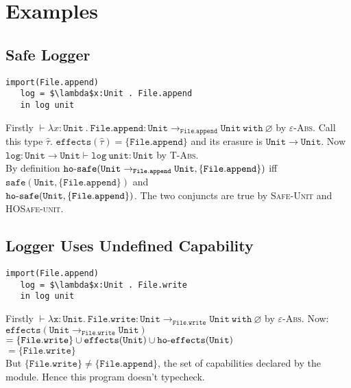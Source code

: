 \documentclass{llncs}
\newcommand{\keywadj}[1]{\mathtt{#1}}
\newcommand{\keyw}[1]{\keywadj{#1}~}
\newcommand{\kw}[1]{\keyw{ #1 }}
\newcommand{\kwa}[1]{\keywadj{ #1 }}
\newcommand{\hyphen}{\hbox{-}}
\newcommand{\unit}[0]{ \kwa{unit} }
\newcommand{\Unit}[0]{ \kwa{Unit} }
\begin{document}
\section{Examples}



\subsection{Safe Logger}
\begin{lstlisting}
import(File.append)
   log = $\lambda$x:Unit . File.append
   in log unit
\end{lstlisting}

\noindent
Firstly $\vdash \lambda x:\kwa{Unit~.~File.append : Unit \rightarrow_{File.append} Unit~\kw{with} \varnothing}$ by \textsc{$\varepsilon$-Abs}. Call this type $\hat \tau$. $\kwa{effects}(\hat \tau) = \{ \kwa{File.append} \}$ and its erasure is $\Unit \rightarrow \Unit$. Now $\kwa{log} : \Unit \rightarrow \Unit \vdash \kwa{log}~\unit : \Unit$ by \textsc{T-Abs}. \\

\noindent
By definition $\kwa{ho \hyphen safe(Unit \rightarrow_{File.append} Unit, \{ \kwa{File.append} \})}$  iff $\kwa{safe}(\Unit, \{ \kwa{File.append} \})$ and \\ $\kwa{ho \hyphen safe}(\Unit, \{ \kwa{File.append} \})$. The two conjuncts are true by \textsc{Safe-Unit} and \textsc{HOSafe-unit}.\\

\subsection{Logger Uses Undefined Capability}
\begin{lstlisting}
import(File.append)
   log = $\lambda$x:Unit . File.write
   in log unit
\end{lstlisting}

\noindent
Firstly $\kwa{\vdash \lambda x:Unit.~File.write: Unit \rightarrow_{File.write} Unit~with~\varnothing}$ by \textsc{$\varepsilon$-Abs}. Now: \\

\noindent
$\kwa{effects}(\kwa{Unit \rightarrow_{File.write} Unit})$ \\
$= \{ \kwa{File.write} \} \cup \kwa{effects}(\Unit) \cup \kwa{ho \hyphen effects}(\Unit)$ \\
$= \{ \kwa{File.write} \}$ \\

\noindent
But $\{ \kwa{File.write} \} \neq \{ \kwa{File.append} \}$, the set of capabilities declared by the module. Hence this program doesn't typecheck. \\
\end{document}
